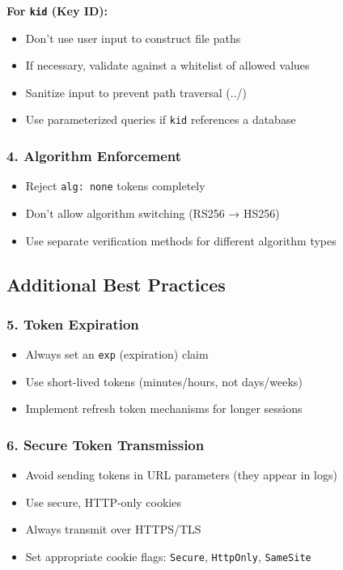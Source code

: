 \documentclass{article}
\begin{document}
\textbf{For \texttt{kid} (Key ID):}
\begin{itemize}
    \item Don't use user input to construct file paths
    \item If necessary, validate against a whitelist of allowed values
    \item Sanitize input to prevent path traversal (../)
    \item Use parameterized queries if \texttt{kid} references a database
\end{itemize}

\subsubsection{4. Algorithm Enforcement}
\begin{itemize}
    \item Reject \texttt{alg: none} tokens completely
    \item Don't allow algorithm switching (RS256 → HS256)
    \item Use separate verification methods for different algorithm types
\end{itemize}

\subsection{Additional Best Practices}

\subsubsection{5. Token Expiration}
\begin{itemize}
    \item Always set an \texttt{exp} (expiration) claim
    \item Use short-lived tokens (minutes/hours, not days/weeks)
    \item Implement refresh token mechanisms for longer sessions
\end{itemize}

\subsubsection{6. Secure Token Transmission}
\begin{itemize}
    \item Avoid sending tokens in URL parameters (they appear in logs)
    \item Use secure, HTTP-only cookies
    \item Always transmit over HTTPS/TLS
    \item Set appropriate cookie flags: \texttt{Secure}, \texttt{HttpOnly}, \texttt{SameSite}
\end{itemize}
\end{document}
